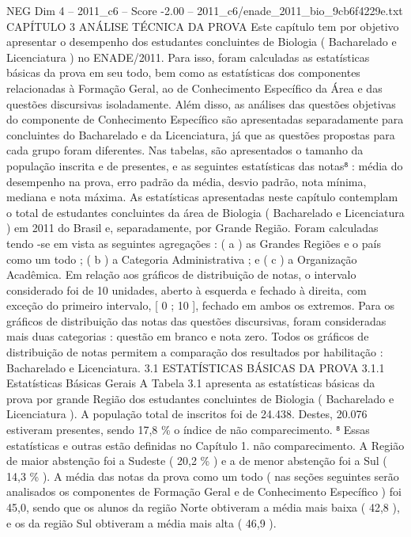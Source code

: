 \begin{textsample}{NEG Dim 4 – 2011\_c6 – Score -2.00 – 2011\_c6/enade\_2011\_bio\_9cb6f4229e.txt}  \label{ex:f4_neg_053}
CAPÍTULO 3 ANÁLISE TÉCNICA DA PROVA Este capítulo tem por objetivo apresentar o desempenho dos estudantes concluintes de Biologia ( Bacharelado e Licenciatura ) no ENADE/2011.
Para isso, foram calculadas as estatísticas básicas da prova em seu todo, bem como as estatísticas dos componentes relacionadas à Formação Geral, ao de Conhecimento Específico da Área e das questões discursivas isoladamente.
Além disso, as análises das questões objetivas do componente de Conhecimento Específico são apresentadas separadamente para concluintes do Bacharelado e da Licenciatura, já que as questões propostas para cada grupo foram diferentes.
Nas tabelas, são apresentados o tamanho da população inscrita e de presentes, e as seguintes estatísticas das notas⁸ : média do desempenho na prova, erro padrão da média, desvio padrão, nota mínima, mediana e nota máxima.
As estatísticas apresentadas neste capítulo contemplam o total de estudantes concluintes da área de Biologia ( Bacharelado e Licenciatura ) em 2011 do Brasil e, separadamente, por Grande Região.
Foram calculadas tendo -se em vista as seguintes agregações : ( a ) as Grandes Regiões e o país como um todo ; ( b ) a Categoria Administrativa ; e ( c ) a Organização Acadêmica.
Em relação aos gráficos de distribuição de notas, o intervalo considerado foi de 10 unidades, aberto à esquerda e fechado à direita, com exceção do primeiro intervalo, [ 0 ; 10 ], fechado em ambos os extremos.
Para os gráficos de distribuição das notas das questões discursivas, foram consideradas mais duas categorias : questão em branco e nota zero.
Todos os gráficos de distribuição de notas permitem a comparação dos resultados por habilitação : Bacharelado e Licenciatura. 3.1 ESTATÍSTICAS BÁSICAS DA PROVA 3.1.1 Estatísticas Básicas Gerais A Tabela 3.1 apresenta as estatísticas básicas da prova por grande Região dos estudantes concluintes de Biologia ( Bacharelado e Licenciatura ).
A população total de inscritos foi de 24.438.
Destes, 20.076 estiveram presentes, sendo 17,8 \% o índice de não comparecimento. ⁸ Essas estatísticas e outras estão definidas no Capítulo 1. não comparecimento.
A Região de maior abstenção foi a Sudeste ( 20,2 \% ) e a de menor abstenção foi a Sul ( 14,3 \% ).
A média das notas da prova como um todo ( nas seções seguintes serão analisados os componentes de Formação Geral e de Conhecimento Específico ) foi 45,0, sendo que os alunos da região Norte obtiveram a média mais baixa ( 42,8 ), e os da região Sul obtiveram a média mais alta ( 46,9 ).

\end{textsample}
